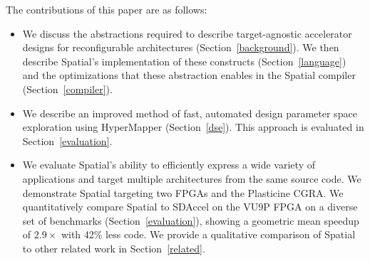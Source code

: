 
The contributions of this paper are as follows:
\vspace{-5pt}
\begin{itemize}
	\item We discuss the abstractions required to describe target-agnostic accelerator designs for reconfigurable architectures (Section~\ref{background}). We then describe Spatial's implementation of these constructs (Section~\ref{language}) and the optimizations that these abstraction enables in the Spatial compiler (Section~\ref{compiler}).

  \vspace{5pt}

	\item We describe an improved method of fast, automated design parameter space exploration using HyperMapper (Section~\ref{dse}). This approach is evaluated in Section~\ref{evaluation}.

  \vspace{5pt}

	\item We evaluate Spatial's ability to efficiently express a wide variety of applications and
    target multiple architectures from the same source code. We demonstrate Spatial targeting two FPGAs and the Plasticine CGRA. 
    We quantitatively compare Spatial to SDAccel on the VU9P FPGA on a diverse set of benchmarks (Section~\ref{evaluation}), showing a geometric mean speedup of $2.9\times$ with 42\% less code.
    We provide a qualitative comparison of Spatial to other related work in Section~\ref{related}.
\end{itemize}




